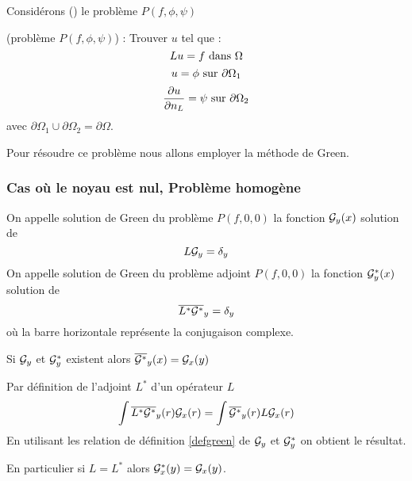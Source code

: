 \documentclass[12pt]{book}
\begin{document}
Consid\'erons (\cite{ph:elect:VanBladel75,ma:equad:Dautray2})
le probl\`eme $P(f,\phi,\psi)$
\begin{prob}\label{probpfppgreen}(probl\`eme $P(f,\phi,\psi)$) :
Trouver $u$ tel que :
\begin{equation}
 Lu=f\ {\rm dans}\ \Omega
\end{equation}
\begin{equation}
u=\phi\ {\rm sur}\ \partial \Omega_1
\end{equation}
\begin{equation}
\frac{\partial u}{\partial n_{L}}=\psi\ {\rm sur}\ \partial \Omega_2
\end{equation}
avec $\partial \Omega_1 \cup\partial \Omega_2=\partial \Omega$.
\end{prob}
Pour r\'esoudre ce probl\`eme nous allons employer la m\'ethode de
Green. 

\subsubsection{Cas o\`u le noyau est nul, Probl\`eme homog\`ene}
\begin{defn}\label{defgreen}
On appelle solution de Green du probl\`eme $P(f,0,0)$ la fonction
${\cal G}_y(x)$ solution de 
\begin{equation}
L{\cal G}_y=\delta_y
\end{equation}
On appelle solution de Green du probl\`eme adjoint $P(f,0,0)$ la fonction
${\cal G}^*_y(x)$ solution de 
\begin{equation}
\overline{L^*{\cal G}^*}_y=\delta_y
\end{equation}
o\`u la barre horizontale repr\'esente la conjugaison complexe.
\end{defn}
\begin{thm}\label{theogreen}
Si ${\cal G}_y$ et ${\cal G}^*_y$ existent alors 
$\overline{{\cal G}^*}_y(x)= {\cal G}_x(y)$
\end{thm}
\begin{pf}
Par d\'efinition de l'adjoint $L^*$ d'un op\'erateur $L$
\begin{equation}
\int \overline{L^*{\cal G^*}}_y(r){\cal G}_x(r)= \int \overline{{\cal
G^*}}_{y}(r)L{\cal G}_x(r) 
\end{equation}
En utilisant les relation de d\'efinition \ref{defgreen}
 de ${\cal G}_y$ et ${\cal G}^*_y$
on obtient le r\'esultat.
\end{pf}
En particulier si $L=L^*$ alors ${\cal G}^*_x(y)= {\cal G}_x(y)$.
\end{document}
